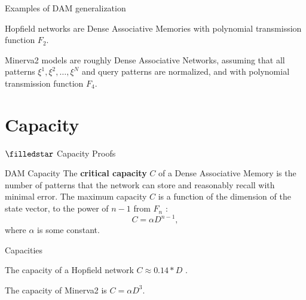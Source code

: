 \documentclass[]{beamer}
\begin{document}
\begin{frame}{Examples of DAM generalization}
  \begin{example}
    Hopfield networks are Dense
    Associative Memories
    with polynomial transmission function $F_2$.
  \end{example}

  \begin{example}
    Minerva2 models \parencite{hintzman_minerva_1984} are roughly Dense
    Associative Networks,
    assuming that all patterns $\xi^1, \xi^2, \dots, \xi^N$ and query
    patterns are normalized,
    and with polynomial transmission function $F_4$.
  \end{example}
\end{frame}

\section{Capacity}
\begin{frame}{$\filledstar$ Capacity Proofs}
  \begin{block}{DAM Capacity}
    The \textbf{critical capacity} $C$ of a Dense Associative Memory is the
    number of patterns that the network can store
    and reasonably recall with minimal error. The maximum capacity
    $C$ is a function of the dimension of the
    state vector, to the power of $n-1$ from $F_n$
    \parencites{demircigil_model_2017,krotov_dense_2016,bao_capacity_2022}:
    $$
    C = \alpha D^{n-1},
    $$
    where $\alpha$ is some constant.
  \end{block}
\end{frame}

\begin{frame}{Capacities}
  \begin{example}
    The capacity of a Hopfield network $C \approx 0.14 * D$
    \parencites{amit_statistical_1987,hopfield_neural_1982}.
  \end{example}

  \begin{example}
    The capacity of Minerva2 is $C = \alpha D^3$.
  \end{example}
\end{frame}
\end{document}
